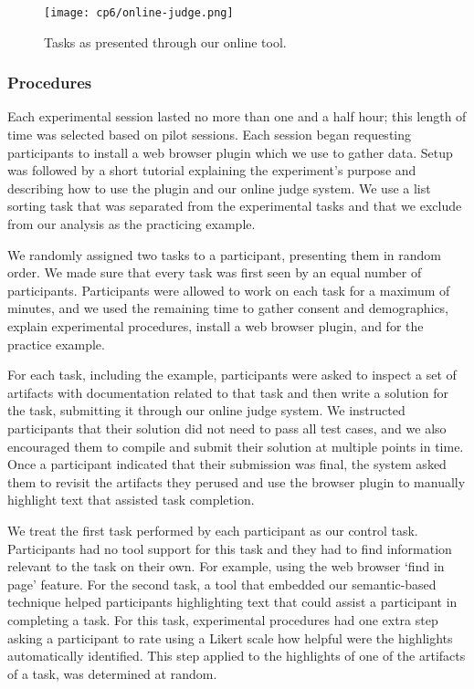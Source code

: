 {\begin{figure}
    \centering
    \texttt{[image: cp6/online-judge.png]}
    \caption{Tasks as presented through our online tool. }
    \label{fig:online-judge}
\end{figure}





\subsubsection{Procedures}
\label{cp6:evaluation-procedures}


Each experimental session lasted no more than one and a half hour; this length of time was selected based on \red{\#} pilot sessions. 
Each session began requesting participants to install a web browser plugin which we use to gather data. Setup was followed by a short tutorial explaining the experiment's purpose and describing how to use the plugin and our online judge system. We use a list sorting task that was separated from the experimental tasks and that we exclude from our analysis as the practicing example. 


We randomly assigned two tasks to a participant, presenting them in random order.  We made sure that every task was first seen by an equal number of participants. Participants were allowed to work on each task for a maximum of  minutes, and we used the remaining time to gather consent and demographics, explain experimental procedures, install a web browser plugin, and for the practice example. 



For each task, including the example, participants were asked to inspect a set of artifacts with documentation related to that task and then write a solution for the task, submitting it through our online judge system. We instructed participants that their solution did not need to pass all test cases, and we also encouraged them to compile and submit their solution at multiple points in time. Once a participant indicated that their submission was final, the system asked them to revisit the artifacts they perused and use the browser plugin to manually highlight text that assisted task completion.


We treat the first task performed by each participant as our control task.
Participants had no tool support for this task and they had to find information relevant to the task on their own. For example, using the web browser `find in page' feature.
For the second task, a tool that embedded our semantic-based technique helped participants 
highlighting text that could assist a participant in completing a task.
For this task, experimental procedures had one extra step asking a participant to rate using a Likert scale how helpful were the highlights automatically identified. This step applied to 
the highlights of one of the artifacts of a task, was determined at random. 







}
